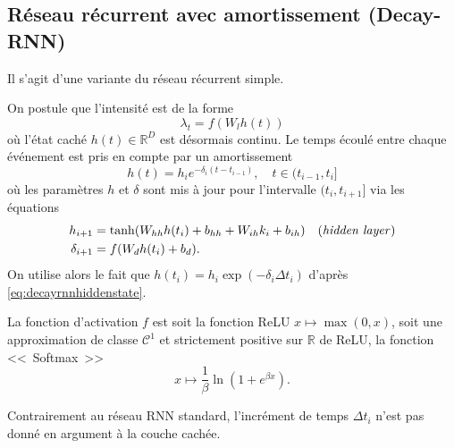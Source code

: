 \documentclass[11pt]{article}
\newcommand{\RR}{\mathbb{R}}
\begin{document}
\subsection{Réseau récurrent avec amortissement (Decay-RNN)}

Il s'agit d'une variante du réseau récurrent simple.

On postule que l'intensité est de la forme
\begin{equation}\label{eq:decayrnnhiddenstate}
	\lambda_t = f(W_l h(t))
\end{equation}
où l'état caché $h(t)\in\RR^D$ est désormais continu. Le temps écoulé entre chaque événement est pris en compte par un amortissement
\begin{equation}
	h(t) = h_{i}e^{-\delta_i(t-t_{i-1})},\quad t\in(t_{i-1},t_i]
\end{equation}
où les paramètres $h$ et $\delta$ sont mis à jour pour l'intervalle $(t_i,t_{i+1}]$ via les équations
\begin{subequations}
\begin{align}
h_{i+1} &= \tanh(W_{hh}h(t_i) + b_{hh} + W_{ih}k_i + b_{ih})\quad\text{(\textit{hidden layer})} \\
\delta_{i+1} &= f(W_dh(t_i) + b_d).
\end{align}
\end{subequations}
On utilise alors le fait que $h(t_i) = h_{i}\exp(-\delta_i\Delta t_i)$ d'après \eqref{eq:decayrnnhiddenstate}.

La fonction d'activation $f$ est soit la fonction ReLU $x\mapsto \max(0,x)$, soit une approximation de classe $\mathcal C^1$ et strictement positive sur $\RR$ de ReLU, la fonction <<~Softmax~>>
\[
	x\mapsto \frac{1}{\beta}\ln(1+e^{\beta x}).
\]

Contrairement au réseau RNN standard, l'incrément de temps $\Delta t_i$ n'est pas donné en argument à la couche cachée.
\end{document}
